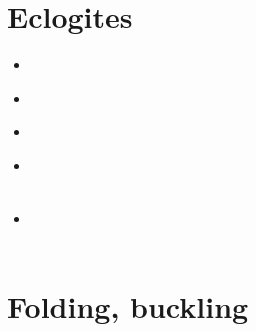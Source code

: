 \section{Eclogites} 

\begin{scriptsize}
\begin{itemize}
\item[\twothousandone] 
\textcite{dohe01} \\
\item[\twothousandseven] 
\textcite{hecb07} \\
\item[\twothousandnine] 
\textcite{agyj09} \\
\item[\twothousandthirteen] 
\textcite{arbi13} \\
\textcite{krcu13} \\
\item[\twothousandtwentytwo] 
\textcite{wakw22} \\
\textcite{yadb22} \\
\end{itemize}
\end{scriptsize}


\section{Folding, buckling} 


